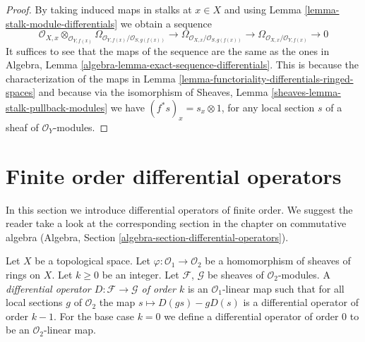 \begin{proof}
By taking induced maps in stalks at $x \in X$ and using
Lemma \ref{lemma-stalk-module-differentials} we obtain a sequence
$$
\mathcal{O}_{X, x} \otimes_{\mathcal{O}_{Y, f(x)}}
\Omega_{\mathcal{O}_{Y, f(x)}/\mathcal{O}_{S, g(f(x))}} \to
\Omega_{\mathcal{O}_{X, x}/\mathcal{O}_{S, g(f(x))}} \to
\Omega_{\mathcal{O}_{X, x}/\mathcal{O}_{Y, f(x)}} \to 0
$$
It suffices to see that the maps of the sequence are the same as
the ones in Algebra, Lemma \ref{algebra-lemma-exact-sequence-differentials}.
This is because the characterization of the maps in
Lemma \ref{lemma-functoriality-differentials-ringed-spaces}
and because via the isomorphism of
Sheaves, Lemma \ref{sheaves-lemma-stalk-pullback-modules}
we have $(f^*s)_x = s_x \otimes 1$,
for any local section $s$ of a sheaf of $\mathcal{O}_Y$-modules.
\end{proof}


















\section{Finite order differential operators}
\label{section-differential-operators}

\noindent
In this section we introduce differential operators of finite order.
We suggest the reader take a look at the corresponding section
in the chapter on commutative algebra
(Algebra, Section \ref{algebra-section-differential-operators}).

\begin{definition}
\label{definition-differential-operators}
Let $X$ be a topological space. Let $\varphi : \mathcal{O}_1 \to \mathcal{O}_2$
be a homomorphism of sheaves of rings on $X$. Let $k \geq 0$ be an integer.
Let $\mathcal{F}$, $\mathcal{G}$ be sheaves of $\mathcal{O}_2$-modules.
A {\it differential operator $D : \mathcal{F} \to \mathcal{G}$ of order $k$}
is an $\mathcal{O}_1$-linear map such that for all local sections
$g$ of $\mathcal{O}_2$ the map $s \mapsto D(gs) - gD(s)$ is a
differential operator of order $k - 1$. For the base case $k = 0$
we define a differential operator of order $0$ to be an
$\mathcal{O}_2$-linear map.
\end{definition}

